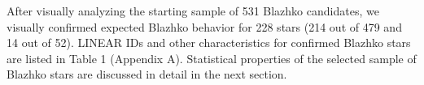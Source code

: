 After visually analyzing the starting sample of 531 Blazhko candidates, we visually confirmed expected Blazhko
behavior for 228 stars (214 out of 479 and 14 out of 52). LINEAR IDs and other characteristics for confirmed
Blazhko stars are listed in Table 1 (Appendix A). Statistical properties of the selected sample of Blazhko stars are
discussed in detail in the next section. 

